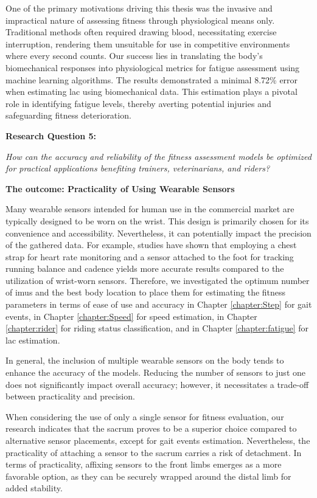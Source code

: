 One of the primary motivations driving this thesis was the invasive and impractical nature of assessing fitness through physiological means only. Traditional methods often required drawing blood, necessitating exercise interruption, rendering them unsuitable for use in competitive environments where every second counts. Our success lies in translating the body's biomechanical responses into physiological metrics for fatigue assessment using machine learning algorithms.  The results demonstrated a minimal 8.72\% error when estimating \gls{lac} using biomechanical data. This estimation plays a pivotal role in identifying fatigue levels, thereby averting potential injuries and safeguarding fitness deterioration.

\vspace{0.3cm}

\noindent\textbf{\large Research Question 5:} 

\textit{How can the accuracy and reliability of the fitness assessment models be optimized for practical applications benefiting trainers, veterinarians, and riders?}

\vspace{.15cm}

\noindent\textbf{The outcome: Practicality of Using Wearable Sensors}

Many wearable sensors intended for human use in the commercial market are typically designed to be worn on the wrist. This design is primarily chosen for its convenience and accessibility. Nevertheless, it can potentially impact the precision of the gathered data. For example, studies have shown that employing a chest strap for heart rate monitoring and a sensor attached to the foot for tracking running balance and cadence yields more accurate results compared to the utilization of wrist-worn sensors. Therefore, we investigated the optimum number of \gls{imu}s and the best body location to place them for estimating the fitness parameters in terms of ease of use and accuracy in Chapter \ref{chapter:Step} for gait events, in Chapter \ref{chapter:Speed} for speed estimation, in Chapter \ref{chapter:rider} for riding status classification, and in Chapter \ref{chapter:fatigue} for \gls{lac} estimation.

In general, the inclusion of multiple wearable sensors on the body tends to enhance the accuracy of the models. Reducing the number of sensors to just one does not significantly impact overall accuracy; however, it necessitates a trade-off between practicality and precision.

When considering the use of only a single sensor for fitness evaluation, our research indicates that the sacrum proves to be a superior choice compared to alternative sensor placements, except for gait events estimation. Nevertheless, the practicality of attaching a sensor to the sacrum carries a risk of detachment. In terms of practicality, affixing sensors to the front limbs emerges as a more favorable option, as they can be securely wrapped around the distal limb for added stability.

